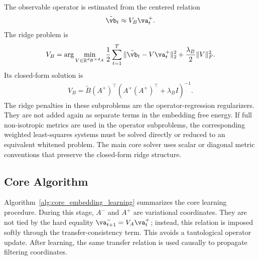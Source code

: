 \documentclass[twoside,11pt]{article}
\begin{document}
The observable operator is estimated from the centered relation
\begin{align}
\tilde{\vb}_t
\approx
V_B\va_t^+.
\end{align}
The ridge problem is
\begin{align}
V_B
=
\arg\min_{V\in\mathbb R^{d_B\times d_A}}
\frac12
\sum_{t=1}^{T}
\|\tilde{\vb}_t - V\va_t^+\|_2^2
+
\frac{\lambda_B}{2}
\|V\|_F^2.
\label{eq:VB_operator_subproblem_revised}
\end{align}
Its closed-form solution is
\begin{align}
V_B
=
\tilde B(A^+)^\top
\left(
A^+(A^+)^\top
+
\lambda_B I
\right)^{-1}.
\label{eq:VB_closed_form_revised}
\end{align}
The ridge penalties in these subproblems are the operator-regression
regularizers. They are not added again as separate terms in the
embedding free energy. If full non-isotropic metrics are used in the
operator subproblems, the corresponding weighted least-squares systems
must be solved directly or reduced to an equivalent whitened problem.
The main core solver uses scalar or diagonal metric conventions that
preserve the closed-form ridge structure.

\subsection{Core Algorithm}

Algorithm~\ref{alg:core_embedding_learning} summarizes the core learning
procedure. During this stage, $A^-$ and $A^+$ are variational
coordinates. They are not tied by the hard equality
$\va_{t+1}^-=V_A\va_t^+$; instead, this relation is imposed softly
through the transfer-consistency term. This avoids a tautological
operator update. After learning, the same transfer relation is used
causally to propagate filtering coordinates.
\end{document}
